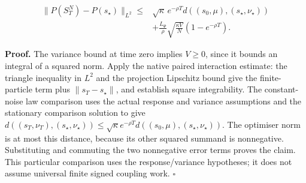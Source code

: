 \documentclass[11pt,a4paper]{report}
\begin{document}
\[\begin{aligned}\|P(S^N_T)-P(s_\star)\|_{L^2}\le {}&\sqrt\kappa\,e^{-\rho T}d((s_0,\mu),(s_\star,\nu_\star))\\&+\frac{L_\Psi}{\rho}\sqrt{\frac{\kappa V}{N}}(1-e^{-\rho T}).\end{aligned}\]

\textbf{Proof.} The variance bound at time zero implies \(V\ge0\), since it bounds an integral of a squared norm. Apply the native paired interaction estimate: the triangle inequality in \(L^2\) and the projection Lipschitz bound give the finite-particle term plus \(\|s_T-s_\star\|\), and establish square integrability. The constant-noise law comparison uses the actual response and variance assumptions and the stationary comparison solution to give \(d((s_T,\nu_T),(s_\star,\nu_\star))\le\sqrt\kappa e^{-\rho T}d((s_0,\mu),(s_\star,\nu_\star))\). The optimiser norm is at most this distance, because its other squared summand is nonnegative. Substituting and commuting the two nonnegative error terms proves the claim. This particular comparison uses the response/\allowbreak{}variance hypotheses; it does not assume universal finite signed coupling work. \(\square\)
\end{document}
